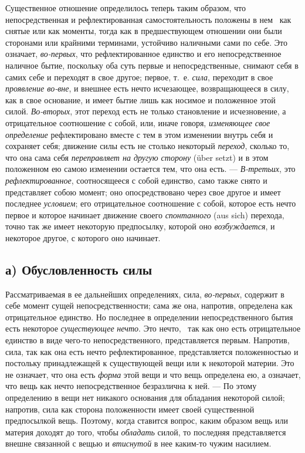 Существенное отношение определилось теперь таким образом, что
непосредственная и рефлектированная самостоятельность положены в
нем~
как снятые или как моменты, тогда как в предшествующем отношении они были
сторонами или крайними терминами, устойчиво наличными сами по себе. Это
означает, {\em во-первых}, что рефлектированное
единство и его непосредственное наличное бытие, поскольку оба суть первые и
непосредственные, снимают себя в самих себе и переходят в свое другое;
первое, т.~е. {\em сила}, переходит в свое
{\em проявление во-вне}, и внешнее есть нечто
исчезающее, возвращающееся в силу, как в свое основание, и имеет бытие лишь
как носимое и положенное этой силой. {\em Во-вторых},
этот переход есть не только становление и исчезновение, а отрицательное
соотношение с собой, или, иначе говоря, {\em изменяющее
свое определение} рефлектировано вместе с тем в этом изменении внутрь себя
и сохраняет себя; движение силы есть не столько некоторый
{\em переход}, сколько то, что она сама себя
{\em переправляет на другую сторону} (über setzt) и в
этом положенном ею самою изменении остается тем, что она есть. —
{\em В-третьих}, это
{\em рефлектированное}, соотносящееся с собой единство,
само также снято и представляет собою момент; оно опосредствовано через
свое другое и имеет последнее {\em условием}; его
отрицательное соотношение с собой, которое есть нечто первое и которое
начинает движение своего {\em спонтанного} (aus sich) перехода, 
точно так же имеет некоторую предпосылку, которой оно
{\em возбуждается}, и некоторое другое, с которого оно
начинает.


\subsection[а) Обусловленность силы]{а) Обусловленность силы}

Рассматриваемая в ее дальнейших определениях,
сила, {\em во-первых}, содержит в себе момент сущей
непосредственности; сама же она, напротив, определена как отрицательное
единство. Но последнее в определении непосредственного бытия есть некоторое
{\em существующее} {\em нечто}. Это
нечто, \ так как оно есть отрицательное единство в виде чего-то
непосредственного, представляется первым. Напротив, сила, так как она есть
нечто рефлектированное, представляется положенностью и постольку
принадлежащей к существующей вещи или к некоторой материи. Это не означает,
что она есть {\em форма} этой вещи и что вещь
определена ею, а означает, что вещь как нечто непосредственное безразлична
к ней. — По этому определению в вещи нет никакого основания для обладания
некоторой силой; напротив, сила как сторона положенности имеет своей
существенной предпосылкой вещь. Поэтому, когда ставится вопрос, каким
образом вещь или материя доходят до того, чтобы
{\em обладать} силой, то последняя представляется
внешне связанной с вещью и {\em втиснутой} в нее
каким-то чужим насилием.

